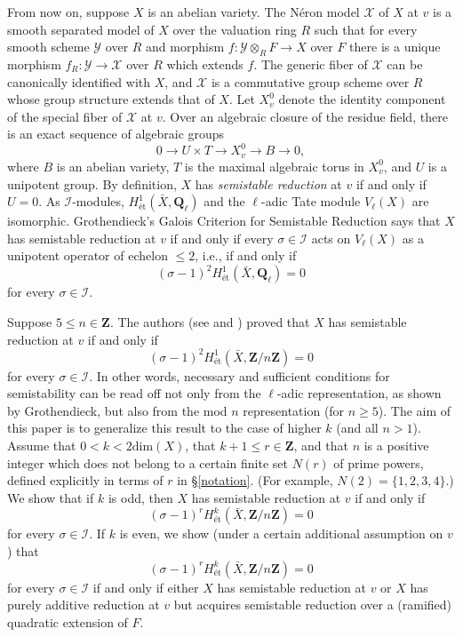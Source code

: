 \documentclass{amsart}
\def\Q{{\mathbf Q}}
\def\Z{{\mathbf Z}}
\def\I{{\mathcal I}}
\def\dim{\mathrm{dim}}
\def\X{{\mathcal X}}
\def\Y{{\mathcal Y}}
\def\T{{T}}
\def\B{{B}}
\theoremstyle{definition}
\begin{document}
 From now on, suppose $X$ is an abelian variety.
The N\'eron model $\X$ of $X$ at $v$ is a smooth 
separated model of $X$ over the valuation ring $R$
such that for every smooth scheme $\Y$ over $R$ and morphism 
$f : \Y \otimes_R F \to X$ over $F$ there is a unique morphism
$f_R : \Y \to \X$ over $R$ which extends $f$. The generic fiber of $\X$
can be canonically identified with $X$, and $\X$ is a commutative group
scheme over $R$ whose group structure extends that of $X$.
Let $X_v^0$ denote the identity component of 
the special fiber of $\X$ at $v$. 
Over an algebraic closure of the residue field, there is
an exact sequence of algebraic groups 
$$0 \to U \times \T \to X_{v}^{0} \to \B \to 0,$$
where $\B$ is an abelian variety, $\T$ is the maximal
algebraic torus in $X_{v}^{0}$, 
and $U$ is a unipotent group.
By definition, $X$ has {\it semistable reduction} at $v$ 
if and only if $U=0$.
As $\I$-modules,
$H^1_{\text{\'et}}({\bar X}, \Q_\ell)$
and the $\ell$-adic Tate module $V_{\ell}(X)$ are isomorphic.
Grothendieck's Galois Criterion for Semistable Reduction 
says that $X$ has semistable reduction at $v$ if and only if
every $\sigma\in\I$ acts on  $V_{\ell}(X)$ 
as a unipotent operator of echelon $\le 2$, i.e.,
if and only if
$$(\sigma-1)^2H^1_{\text{\'et}}({\bar X}, \Q_\ell)=0$$
for every $\sigma\in\I$.

Suppose $5 \le n \in \Z$. The authors 
(see \cite{degree} and \cite{banff})  proved that
$X$ has semistable reduction at $v$ if and only if
$$(\sigma-1)^{2} H^1_{\text{\'et}}({\bar X}, \Z/n\Z)
=0$$
for every $\sigma \in \I$.
In other words, necessary and sufficient conditions for 
semistability can be read off not only
from the $\ell$-adic representation, as shown by
Grothendieck, but also from the mod $n$ representation
(for $n \ge 5$).
The aim of this paper is to generalize this result to the 
case of higher $k$ (and all $n>1$). 
Assume that $0<k<2\dim(X)$, that $k+1 \le r\in\Z$, and that 
$n$ is a positive integer which does not belong
to a certain finite set  $N(r)$ of prime powers, 
defined explicitly in terms of $r$ in \S\ref{notation}.
(For example, $N(2)=\{1,2,3,4\}$.)  We show that if $k$ is odd, 
then $X$ has semistable reduction at $v$ if and only if
$$(\sigma-1)^{r} H^{k}_{\text{\'et}}({\bar X}, \Z/n\Z)
=0$$
for every $\sigma \in \I$.
If $k$ is even, we show  
(under a certain additional assumption on $v$) that
$$(\sigma-1)^{r} H^{k}_{\text{\'et}}({\bar X}, \Z/n\Z)
=0$$
for every $\sigma \in \I$
if and only if either $X$ has semistable reduction 
at $v$ or
$X$ has purely additive reduction at $v$ but acquires 
semistable reduction
over a (ramified) quadratic extension of $F$.
\end{document}
